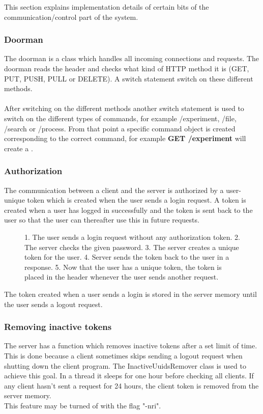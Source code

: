 This section explains implementation details of certain bits of the communication/control part of the system.
\subsubsection{Doorman}
The doorman is a class which handles all incoming connections and requests. The doorman reads the header and checks what kind of HTTP method it is (GET, PUT, PUSH, PULL or DELETE). A switch statement switch on these different methods.\\
\\
After switching on the different methods another switch statement is used to switch on the different types of commands, for example /experiment, /file, /search or /process. From that point a specific command object is created corresponding to the correct command, for example \textbf{GET /experiment} will create a .
\subsubsection{Authorization}
The communication between a client and the server is authorized by a user-unique token which is created when the user sends a login request. A token is created when a user has logged in successfully and the token is sent back to the user so that the user can thereafter use this in future requests. 
\begin{figure}[h]
\caption{1. The user sends a login request without any authorization token. 2. The server checks the given password. 3. The server creates a unique token for the user. 4. Server sends the token back to the user in a response. 5. Now that the user has a unique token, the token is placed in the header whenever the user sends another request.}
\label{fig:com_authorization}
\end{figure}
The token created when a user sends a login is stored in the server memory until the user sends a logout request.
\subsubsection{Removing inactive tokens}
The server has a function which removes inactive tokens after a set limit of time. This is done because a client sometimes skips sending a logout request when shutting down the client program. The InactiveUuidsRemover class is used to achieve this goal. In a thread it sleeps for one hour before checking all clients. If any client hasn't sent a request for 24 hours, the client token is removed from the server memory. 
\\
This feature may be turned of with the flag "-nri".
